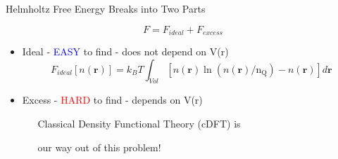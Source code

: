 \documentclass{beamer}
\renewcommand{\vec}[1]{\mathbf{#1}}
\begin{document}

\begin{frame}{Helmholtz Free Energy Breaks into Two Parts}
    \begin{block}{}
        \vspace{-2em}
        \begin{displaymath}F=F_{ideal} + F_{excess}\end{displaymath}
        \vspace{-.7em}        
        \begin{itemize}            
           \item Ideal - \textcolor{blue}{EASY} to find - does not depend on V(r) 
           \begin{displaymath}F_{ideal}[n(\vec{r})]= k_BT\int_{Vol}[n(\vec{r})\ln(n(\vec{r})/\text{n}_\text{Q})-n(\vec{r})]d\vec{r}\end{displaymath}
           \vspace{+0.01em} 
           \item Excess - \textcolor{red}{HARD} to find - depends on V(r) 
           
        \vspace{+1.5em} 
            $~~~~~~~$Classical Density Functional Theory (cDFT) is 
            
            $~~~~~~~$our way out of this problem!
        \end{itemize}
     \end{block}
\end{frame}
\end{document}
